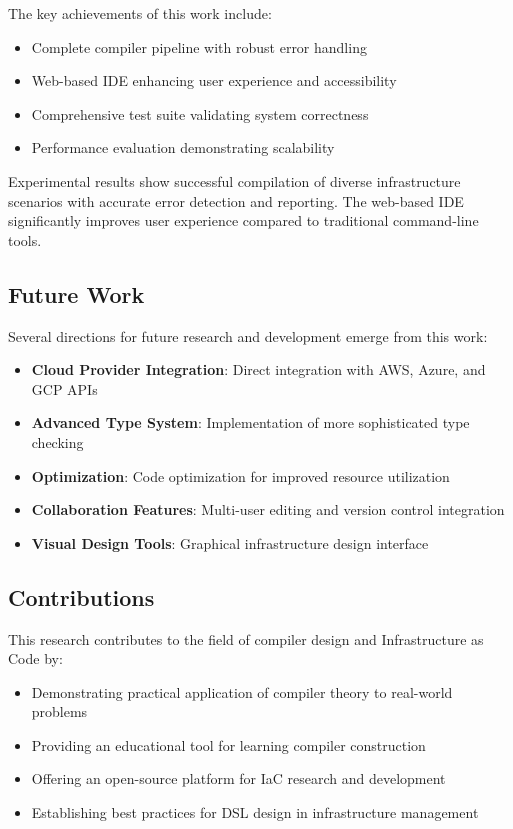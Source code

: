 \documentclass[journal,twocolumn,10pt]{IEEEtran}
\begin{document}
The key achievements of this work include:
\begin{itemize}
    \item Complete compiler pipeline with robust error handling
    \item Web-based IDE enhancing user experience and accessibility
    \item Comprehensive test suite validating system correctness
    \item Performance evaluation demonstrating scalability
\end{itemize}

Experimental results show successful compilation of diverse infrastructure scenarios with accurate error detection and reporting. The web-based IDE significantly improves user experience compared to traditional command-line tools.

\subsection{Future Work}

Several directions for future research and development emerge from this work:

\begin{itemize}
    \item \textbf{Cloud Provider Integration}: Direct integration with AWS, Azure, and GCP APIs
    \item \textbf{Advanced Type System}: Implementation of more sophisticated type checking
    \item \textbf{Optimization}: Code optimization for improved resource utilization
    \item \textbf{Collaboration Features}: Multi-user editing and version control integration
    \item \textbf{Visual Design Tools}: Graphical infrastructure design interface
\end{itemize}

\subsection{Contributions}

This research contributes to the field of compiler design and Infrastructure as Code by:
\begin{itemize}
    \item Demonstrating practical application of compiler theory to real-world problems
    \item Providing an educational tool for learning compiler construction
    \item Offering an open-source platform for IaC research and development
    \item Establishing best practices for DSL design in infrastructure management
\end{itemize}
\end{document}
